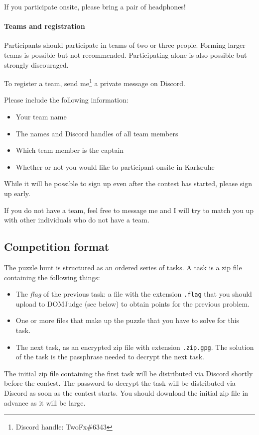 \documentclass[fontsize=10pt,a4paper,DIV=12,parskip=half]{scrarticle}
\begin{document}
If you participate onsite, please bring a pair of headphones!

\paragraph{Teams and registration}

Participants should participate in teams of two or three people. Forming larger
teams is possible but not recommended. Participating alone is also possible but
strongly discouraged.

To register a team, send me\footnote{Discord handle: TwoFx\#6343} a private
message on Discord.

Please include the following information:
\begin{itemize}
	\item Your team name
	\item The names and Discord handles of all team members
	\item Which team member is the captain
	\item Whether or not you would like to participant onsite in Karlsruhe
\end{itemize}

While it will be possible to sign up even after the contest has started, please
sign up early.

If you do not have a team, feel free to message me and I will try to match you up
with other individuals who do not have a team.

\subsection*{Competition format}
The puzzle hunt is structured as an ordered series of tasks. A task is a
zip file containing the following things:
\begin{itemize}
	\item The \textit{flag} of the previous task: a file with the extension
		\texttt{.flag} that you should upload to DOMJudge (see below) to obtain
		points for the previous problem.
	\item One or more files that make up the puzzle that you have to solve for this
		task.
	\item The next task, as an encrypted zip file with extension \texttt{.zip.gpg}.
		The solution of the task is the passphrase needed to decrypt the next task.
\end{itemize}

The initial zip file containing the first task will be distributed via Discord
shortly before the contest. The password to decrypt the task will be
distributed via Discord as soon as the contest starts. You should download the
initial zip file in advance as it will be large.
\end{document}

